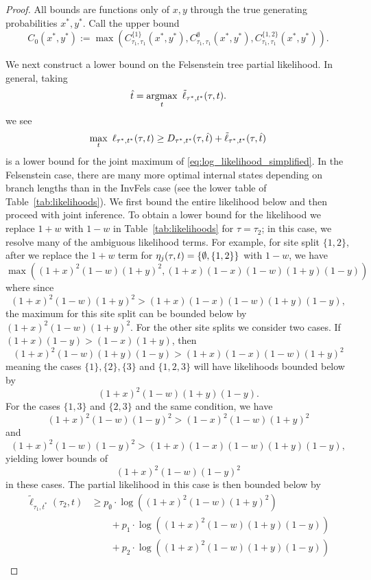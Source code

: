 \begin{proof}
All bounds are functions only of $x,y$ through the true generating probabilities $x^*, y^*$.
Call the upper bound
\[
C_0(x^*, y^*) := \max\left(C^{\{1\}}_{\tau_1,\tau_1}(x^*, y^*), C^{\emptyset}_{\tau_1,\tau_1}(x^*, y^*), C^{\{1,2\}}_{\tau_1,\tau_1}(x^*, y^*)\right).
\]

We next construct a lower bound on the Felsenstein tree partial likelihood.
In general, taking
\[
\hat{t} = \operatorname*{argmax}_{t} \ \tilde{\ell}_{\tau^*,t^*}(\tau, t).
\]
we see
\[
\max_{t} \ \ell_{\tau^*,t^*}(\tau, t) \ge
    D_{\tau^*,t^*}(\tau,\hat{t})
    + \tilde{\ell}_{\tau^*,t^*}(\tau, \hat{t})
\]
is a lower bound for the joint maximum of \eqref{eq:log_likelihood_simplified}.
In the Felsenstein case, there are many more optimal internal states depending on branch lengths than in the InvFels case (see the lower table of Table~\ref{tab:likelihoods}).
We first bound the entire likelihood below and then proceed with joint inference.
To obtain a lower bound for the likelihood we replace $1+w$ with $1-w$ in Table~\ref{tab:likelihoods} for $\tau = \tau_2$; in this case, we resolve many of the ambiguous likelihood terms.
For example, for site split $\{1,2\}$, after we replace the $1+w$ term for $\eta_j(\tau, t)=\{\emptyset, \{1,2\}\}$ with $1-w$, we have
\[
\max\left((1+x)^2 (1-w)(1+y)^2, (1+x)(1-x)(1-w)(1+y)(1-y)\right)
\]
where since
\[
(1+x)^2 (1-w)(1+y)^2 > (1+x)(1-x)(1-w)(1+y)(1-y),
\]
the maximum for this site split can be bounded below by $(1+x)^2 (1-w)(1+y)^2$.
For the other site splits we consider two cases.
If $(1+x)(1-y) > (1-x)(1+y)$, then
\[
(1+x)^2(1-w)(1+y)(1-y) > (1+x)(1-x)(1-w)(1+y)^2
\]
meaning the cases $\{1\}, \{2\}, \{3\}$ and $\{1,2,3\}$ will have likelihoods bounded below by
\[
(1+x)^2(1-w)(1+y)(1-y).
\]
For the cases $\{1,3\}$ and $\{2,3\}$ and the same condition, we have
\[
(1+x)^2(1-w)(1-y)^2 > (1-x)^2(1-w)(1+y)^2
\]
and
\[
(1+x)^2(1-w)(1-y)^2 > (1+x)(1-x)(1-w)(1+y)(1-y),
\]
yielding lower bounds of
\[
(1+x)^2(1-w)(1-y)^2
\]
in these cases.
The partial likelihood in this case is then bounded below by
\begin{align*}
    \tilde{\ell}_{\tau_1,t^*}(\tau_2, t)
    &\ge      p_{\emptyset}  \cdot\log((1+x)^2   (1-w)(1+y)^2) \\
    &\qquad + p_{1}          \cdot\log((1+x)^2   (1-w)(1+y)(1-y)) \\
    &\qquad + p_{2}          \cdot\log((1+x)^2   (1-w)(1+y)(1-y)) \\

\end{align*}
\end{proof}
